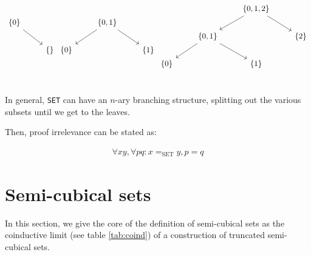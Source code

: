 \documentclass[10pt]{art}
\begin{document}
\begin{equation*}
  \begin{tikzcd}
    \{0\} \arrow[dr] & \\
    & \{\} \\
  \end{tikzcd}
  \begin{tikzcd}
    & \{0, 1\} \arrow[dr]\arrow[dl] & \\
    \{0\} & & \{1\} \\
  \end{tikzcd}
  \begin{tikzcd}
    & & \{0, 1, 2\} \arrow[dr]\arrow[dl] & \\
    & \{0, 1\} \arrow[dl]\arrow[dr] & & \{2\} \\
    \{0\} & & \{1\} & \\
  \end{tikzcd}
\end{equation*}

In general, \texttt{SET} can have an $n$-ary branching structure, splitting out the various subsets until we get to the leaves.

Then, proof irrelevance can be stated as:

\begin{align*}
  \forall x y, \forall p q : x =_{\textrm{SET}} y, p = q
\end{align*}

\section{Semi-cubical sets}
In this section, we give the core of the definition of semi-cubical
sets as the coinductive limit (see table \ref{tab:coind}) of a
construction of truncated semi-cubical sets.
\end{document}
